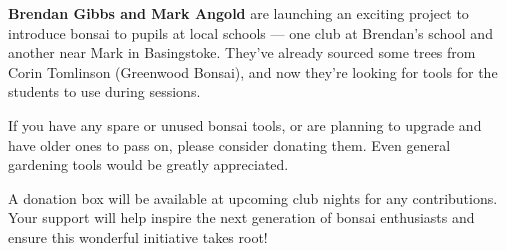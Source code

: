 \label{2026-01-news}

%
%

\noindent
\textbf{Brendan Gibbs and Mark Angold} are launching an exciting project to introduce bonsai to pupils at local schools --- one club at Brendan's school and another near Mark in Basingstoke. They've already sourced some trees from Corin Tomlinson (Greenwood Bonsai), and now they're looking for tools for the students to use during sessions.

If you have any spare or unused bonsai tools, or are planning to upgrade and have older ones to pass on, please consider donating them. Even general gardening tools would be greatly appreciated.

A donation box will be available at upcoming club nights for any contributions. Your support will help inspire the next generation of bonsai enthusiasts and ensure this wonderful initiative takes root!


	
	
